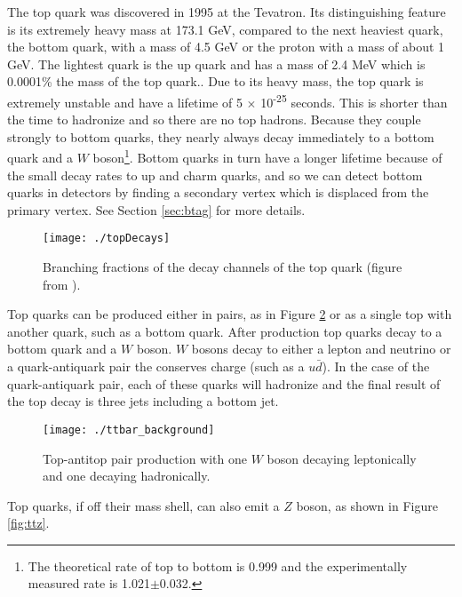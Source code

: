 The top quark was discovered in 1995 at the Tevatron\cite{topdiscovery}.  Its distinguishing feature is its extremely heavy mass at 173.1 GeV, compared to the next heaviest quark, the bottom quark, with a mass of 4.5 GeV or the proton with a mass of about 1 GeV.  The lightest quark is the up quark and has a mass of 2.4 MeV which is 0.0001\% the mass of the top quark..  Due to its heavy mass, the top quark is extremely unstable and have a lifetime of 5 $\times$ 10\textsuperscript{-25} seconds. This is shorter than the time to hadronize and so there are no top hadrons.  Because they couple strongly to bottom quarks, they nearly always decay immediately to a bottom quark and a $W$ boson\footnote{The theoretical rate of top to bottom is 0.999 and the experimentally measured rate is 1.021$\pm$0.032\cite{pdg}.}.  Bottom quarks in turn have a longer lifetime because of the small decay rates to up and charm quarks, and so we can detect bottom quarks in detectors by finding a secondary vertex which is displaced from the primary vertex.  See Section \ref{sec:btag} for more details. \\

\begin{figure}[h!]
  \centering
	\texttt{[image: ./topDecays]}
\caption[Branching fractions of the decay channels of the top quark]{\label{fig:dmMake}{Branching fractions of the decay channels of the top quark (figure from \cite{topquarkdecaysPieChart}).}} 
\end{figure}


Top quarks can be produced either in pairs, as in Figure \ref{fig:ttbarfeynman} or as a single top with another quark, such as a bottom quark.  After production top quarks decay to a bottom quark and a $W$ boson.  $W$ bosons decay to either a lepton and neutrino or a quark-antiquark pair the conserves charge (such as a $u\bar{d}$).  In the case of the quark-antiquark pair, each of these quarks will hadronize and the final result of the top decay is three jets including a bottom jet.  \\

\begin{figure}[h!]
  \centering
	\texttt{[image: ./ttbar\_background]}
\caption[Top-antitop pair production]{\label{fig:ttbarfeynman}{ Top-antitop pair production with one $W$ boson decaying leptonically and one decaying hadronically. }} 
\end{figure}

Top quarks, if off their mass shell, can also emit a $Z$ boson, as shown in Figure \ref{fig:ttz}. \\

